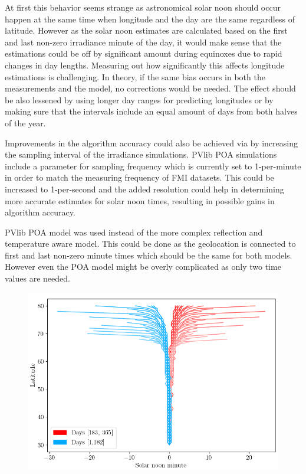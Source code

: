 At first this behavior seems strange as astronomical solar noon should occur happen at the same time when longitude and the day are the same regardless of latitude. However as the solar noon estimates are calculated based on the first and last non-zero irradiance minute of the day, it would make sense that the estimations could be off by significant amount during equinoxes due to rapid changes in day lengths. Measuring out how significantly this affects longitude estimations is challenging. In theory, if the same bias occurs in both the measurements and the model, no corrections would be needed. The effect should be also lessened by using longer day ranges for predicting longitudes or by making sure that the intervals include an equal amount of days from both halves of the year. 

Improvements in the algorithm accuracy could also be achieved via by increasing the sampling interval of the irradiance simulations. PVlib POA simulations include a parameter for sampling frequency which is currently set to 1-per-minute in order to match the measuring frequency of FMI datasets. This could be increased to 1-per-second and the added resolution could help in determining more accurate estimates for solar noon times, resulting in possible gains in algorithm accuracy.

PVlib POA model was used instead of the more complex reflection and temperature aware model. This could be done as the geolocation is connected to first and last non-zero minute times which should be the same for both models. However even the POA model might be overly complicated as only two time values are needed.




\begin{figure}[]
\centering
\includegraphics[width=1\linewidth]{pics/solarnoontimes2}
\label{fig_solarnoontimes}
\end{figure}







